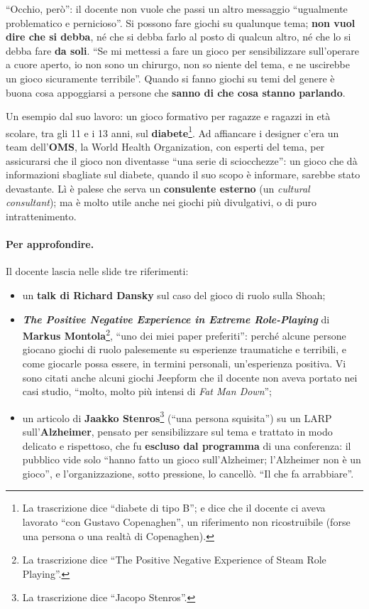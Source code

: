 ``Occhio, però'': il docente non vuole che passi un altro messaggio ``ugualmente
problematico e pernicioso''. Si possono fare giochi su qualunque tema; \textbf{non
vuol dire che si debba}, né che si debba farlo al posto di qualcun altro, né che lo
si debba fare \textbf{da soli}. ``Se mi mettessi a fare un gioco per sensibilizzare
sull'operare a cuore aperto, io non sono un chirurgo, non so niente del tema, e ne
uscirebbe un gioco sicuramente terribile''. Quando si fanno giochi su temi del genere
è buona cosa appoggiarsi a persone che \textbf{sanno di che cosa stanno parlando}.

Un esempio dal suo lavoro: un gioco formativo per ragazze e ragazzi in età scolare,
tra gli 11 e i 13 anni, sul \textbf{diabete}\footnote{La trascrizione dice
``diabete di tipo B''; e dice che il docente ci aveva lavorato ``con Gustavo
Copenaghen'', un riferimento non ricostruibile (forse una persona o una realtà di
Copenaghen).}. Ad affiancare i designer c'era un team dell'\textbf{OMS}, la World
Health Organization, con esperti del tema, per assicurarsi che il gioco non
diventasse ``una serie di sciocchezze'': un gioco che dà informazioni sbagliate sul
diabete, quando il suo scopo è informare, sarebbe stato devastante. Lì è palese che
serva un \textbf{consulente esterno} (un \emph{cultural consultant}); ma è molto
utile anche nei giochi più divulgativi, o di puro intrattenimento.

\paragraph{Per approfondire.} Il docente lascia nelle slide tre riferimenti:
\begin{itemize}
  \item un \textbf{talk di Richard Dansky} sul caso del gioco di ruolo sulla Shoah;
  \item \textbf{\emph{The Positive Negative Experience in Extreme Role-Playing}} di
        \textbf{Markus Montola}\footnote{La trascrizione dice ``The Positive
        Negative Experience of Steam Role Playing''.}, ``uno dei miei paper
        preferiti'': perché alcune persone giocano giochi di ruolo palesemente su
        esperienze traumatiche e terribili, e come giocarle possa essere, in
        termini personali, un'esperienza positiva. Vi sono citati anche alcuni
        giochi Jeepform che il docente non aveva portato nei casi studio, ``molto,
        molto più intensi di \emph{Fat Man Down}'';
  \item un articolo di \textbf{Jaakko Stenros}\footnote{La trascrizione dice
        ``Jacopo Stenros''.} (``una persona squisita'') su un LARP
        sull'\textbf{Alzheimer}, pensato per sensibilizzare sul tema e trattato in
        modo delicato e rispettoso, che fu \textbf{escluso dal programma} di una
        conferenza: il pubblico vide solo ``hanno fatto un gioco sull'Alzheimer;
        l'Alzheimer non è un gioco'', e l'organizzazione, sotto pressione, lo
        cancellò. ``Il che fa arrabbiare''.
\end{itemize}

